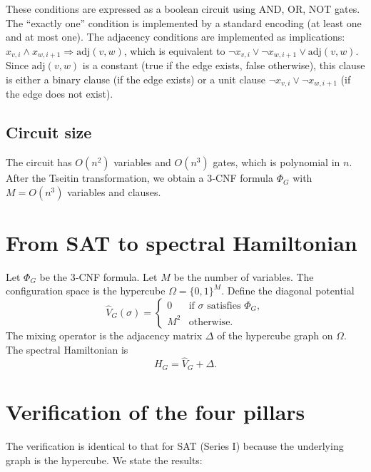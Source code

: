 \documentclass[11pt,a4paper]{article}
\begin{document}
These conditions are expressed as a boolean circuit using AND, OR, NOT gates. The “exactly one” condition is implemented by a standard encoding (at least one and at most one). The adjacency conditions are implemented as implications: \(x_{v,i} \land x_{w,i+1} \Rightarrow \text{adj}(v,w)\), which is equivalent to \(\neg x_{v,i} \lor \neg x_{w,i+1} \lor \text{adj}(v,w)\). Since \(\text{adj}(v,w)\) is a constant (true if the edge exists, false otherwise), this clause is either a binary clause (if the edge exists) or a unit clause \(\neg x_{v,i} \lor \neg x_{w,i+1}\) (if the edge does not exist).

\subsection{Circuit size}

The circuit has \(O(n^2)\) variables and \(O(n^3)\) gates, which is polynomial in \(n\). After the Tseitin transformation, we obtain a 3‑CNF formula \(\Phi_G\) with \(M = O(n^3)\) variables and clauses.

\section{From SAT to spectral Hamiltonian}

Let \(\Phi_G\) be the 3‑CNF formula. Let \(M\) be the number of variables. The configuration space is the hypercube \(\Omega = \{0,1\}^M\). Define the diagonal potential
\[
\hat{V}_G(\sigma) = \begin{cases}
0 & \text{if } \sigma \text{ satisfies } \Phi_G,\\
M^2 & \text{otherwise}.
\end{cases}
\]
The mixing operator is the adjacency matrix \(\Delta\) of the hypercube graph on \(\Omega\). The spectral Hamiltonian is
\[
H_G = \hat{V}_G + \Delta.
\]

\section{Verification of the four pillars}

The verification is identical to that for SAT (Series I) because the underlying graph is the hypercube. We state the results:
\end{document}
